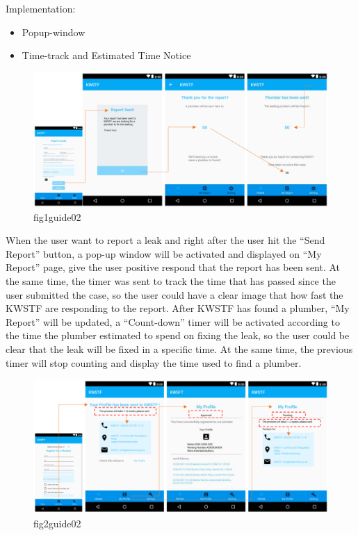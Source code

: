 \documentclass{article}
\begin{document}
\noindent
Implementation:
\begin{itemize}
\item Popup-window
\item Time-track and Estimated Time Notice
\end{itemize}
\begin{figure}
\centering
\includegraphics[width=15cm]{files/figures/fig1_guide2.png}
\caption{fig1guide02}
\end{figure}

When the user want to report a leak and right after the user hit the “Send Report” button, a pop-up window will be
activated and displayed on “My Report” page, give the user positive respond that the report has been sent. At the same
time, the timer was sent to track the time that has passed since the user submitted the case, so the user could have a clear
image that how fast the KWSTF are responding to the report.
After KWSTF has found a plumber, “My Report” will be updated, a “Count-down” timer will be activated according to the
time the plumber estimated to spend on fixing the leak, so the user could be clear that the leak will be fixed in a specific
time. At the same time, the previous timer will stop counting and display the time used to find a plumber.

\begin{figure}
\centering
\includegraphics[width=15cm]{files/figures/fig2_guide2.png}
\caption{fig2guide02}
\end{figure}
\end{document}
